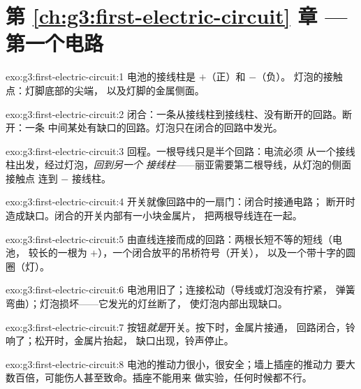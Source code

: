 \section*{第 \ref{ch:g3:first-electric-circuit} 章 --- 第一个电路}

\begin{solution}{exo:g3:first-electric-circuit:1}
电池的接线柱是 $+$（正）和 $-$（负）。
灯泡的接触点：灯脚底部的尖端，
以及灯脚的金属侧面。
\end{solution}

\begin{solution}{exo:g3:first-electric-circuit:2}
闭合：一条从接线柱到接线柱、没有断开的回路。断开：一条
中间某处有缺口的回路。灯泡只在闭合的回路中发光。
\end{solution}

\begin{solution}{exo:g3:first-electric-circuit:3}
回程。一根导线只是半个回路：电流必须
从一个接线柱出发，经过灯泡，\emph{回到另一个
接线柱}——丽亚需要第二根导线，从灯泡的侧面接触点
连到 $-$ 接线柱。
\end{solution}

\begin{solution}{exo:g3:first-electric-circuit:4}
开关就像回路中的一扇门：闭合时接通电路；
断开时造成缺口。闭合的开关内部有一小块金属片，
把两根导线连在一起。
\end{solution}

\begin{solution}{exo:g3:first-electric-circuit:5}
由直线连接而成的回路：两根长短不等的短线（电池，
较长的一根为 $+$），一个闭合放平的吊桥符号（开关），
以及一个带十字的圆圈（灯）。
\end{solution}

\begin{solution}{exo:g3:first-electric-circuit:6}
电池用旧了；连接松动（导线或灯泡没有拧紧，
弹簧弯曲）；灯泡损坏——它发光的灯丝断了，
使灯泡内部出现缺口。
\end{solution}

\begin{solution}{exo:g3:first-electric-circuit:7}
按钮\emph{就是}开关。按下时，金属片接通，
回路闭合，铃响了；松开时，金属片抬起，
缺口出现，铃声停止。
\end{solution}

\begin{solution}{exo:g3:first-electric-circuit:8}
电池的推动力很小，很安全；墙上插座的推动力
要大数百倍，可能伤人甚至致命。插座不能用来
做实验，任何时候都不行。
\end{solution}

